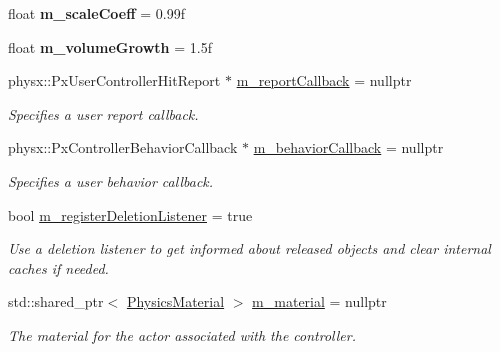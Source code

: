 \begin{Indent}
\begin{DoxyCompactItemize}
float {\bfseries m\+\_\+scale\+Coeff} = 0.\+99f
\item 
\mbox{\label{classrev_1_1_controller_description_a0b6d99ad1f04394b8d2f3ce7133cb242}} 
float {\bfseries m\+\_\+volume\+Growth} = 1.\+5f
\item 
\mbox{\label{classrev_1_1_controller_description_aa8e8bba30a424bd1444d6492f4a1e9f5}} 
physx\+::\+Px\+User\+Controller\+Hit\+Report $\ast$ \mbox{\hyperlink{classrev_1_1_controller_description_aa8e8bba30a424bd1444d6492f4a1e9f5}{m\+\_\+report\+Callback}} = nullptr
\begin{DoxyCompactList}\small\item\em Specifies a user report callback. \end{DoxyCompactList}\item 
\mbox{\label{classrev_1_1_controller_description_a56004c49753317bab0bbba99a1217592}} 
physx\+::\+Px\+Controller\+Behavior\+Callback $\ast$ \mbox{\hyperlink{classrev_1_1_controller_description_a56004c49753317bab0bbba99a1217592}{m\+\_\+behavior\+Callback}} = nullptr
\begin{DoxyCompactList}\small\item\em Specifies a user behavior callback. \end{DoxyCompactList}\item 
\mbox{\label{classrev_1_1_controller_description_a3687860a2c8f31b9c4bf203d006dfe87}} 
bool \mbox{\hyperlink{classrev_1_1_controller_description_a3687860a2c8f31b9c4bf203d006dfe87}{m\+\_\+register\+Deletion\+Listener}} = true
\begin{DoxyCompactList}\small\item\em Use a deletion listener to get informed about released objects and clear internal caches if needed. \end{DoxyCompactList}\item 
std\+::shared\+\_\+ptr$<$ \mbox{\hyperlink{classrev_1_1_physics_material}{Physics\+Material}} $>$ \mbox{\hyperlink{classrev_1_1_controller_description_a2f7d222b7aca3fd4e7036200f5480167}{m\+\_\+material}} = nullptr
\begin{DoxyCompactList}\small\item\em The material for the actor associated with the controller. \end{DoxyCompactList}\item 

\end{DoxyCompactItemize}
\end{Indent}

